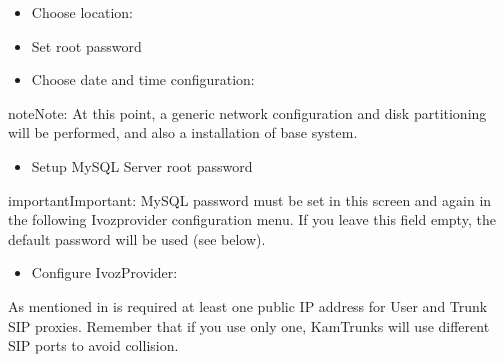 \documentclass[letterpaper,10pt,english]{sphinxmanual}
\begin{document}
\noindent{}
\begin{itemize}
\item {} 
Choose location:

\end{itemize}

\noindent{}
\begin{itemize}
\item {} 
Set root password

\end{itemize}

\noindent{}
\begin{itemize}
\item {} 
Choose date and time configuration:

\end{itemize}

\noindent{}

\begin{notice}{note}{Note:}
At this point, a generic network configuration and disk partitioning
will be performed, and also a installation of base system.
\end{notice}
\begin{itemize}
\item {} 
Setup MySQL Server root password

\end{itemize}

\noindent{}

\begin{notice}{important}{Important:}
MySQL password must be set in this screen and again in the following
Ivozprovider configuration menu. If you leave this field empty, the default password
will be used (see below).
\end{notice}
\begin{itemize}
\item {} 
Configure IvozProvider:

\end{itemize}

\noindent{}

As mentioned in {\hyperref[basic_concepts/installation/requirements:minimum\string-requirements]{}} is required at least one public IP
address for User and Trunk SIP proxies. Remember that if you use only one,
KamTrunks will use different SIP ports to avoid collision.
\end{document}
